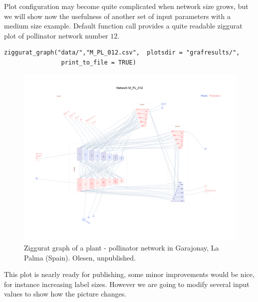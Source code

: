 \documentclass[11pt]{article}
\begin{document}
\clearpage
Plot configuration may become quite complicated when network size grows, but we will show now the usefulness of another set
of input parameters with a medium size example. Default function call provides a quite readable ziggurat plot of pollinator
network number $12$.

\fontsize{3.5mm}{3.5mm}\selectfont
\begin{verbatim}
ziggurat_graph("data/","M_PL_012.csv",  plotsdir = "grafresults/", 
                print_to_file = TRUE)
\end{verbatim}
\normalsize

\begin{figure}[hp!]
\centering
\includegraphics[scale=0.4]{M_PL_012_ziggurat.png}
\caption {Ziggurat graph of a plant - pollinator network in Garajonay, La Palma (Spain). Olesen, unpublished.}
\label{fig:KMAN_ziggurat_012}
\end{figure}

This plot is nearly ready for publishing, some minor improvements would be nice, for instance increasing label sizes. However
we are going to modify several input values to show how the picture changes.
\end{document}

